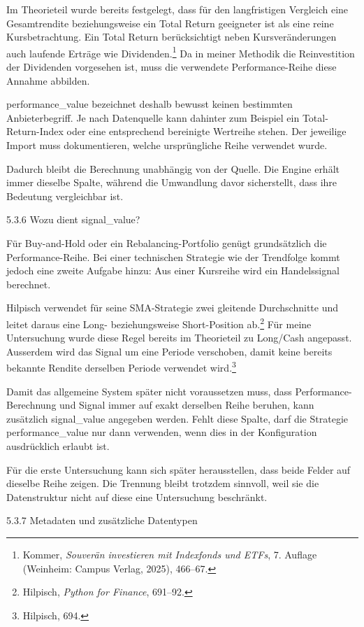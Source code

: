 \documentclass[
  ngerman,
  a4paper,
  DIV=11,
  oneside]{scrreprt}
\begin{document}
Im Theorieteil wurde bereits festgelegt, dass für den langfristigen
Vergleich eine Gesamtrendite beziehungsweise ein Total Return geeigneter
ist als eine reine Kursbetrachtung. Ein Total Return berücksichtigt
neben Kursveränderungen auch laufende Erträge wie Dividenden.\footnote{Kommer,
  \emph{Souverän investieren mit Indexfonds und ETFs}, 7. Auflage
  (Weinheim: Campus Verlag, 2025), 466--67.} Da in meiner Methodik die
Reinvestition der Dividenden vorgesehen ist, muss die verwendete
Performance-Reihe diese Annahme abbilden.

performance\_value bezeichnet deshalb bewusst keinen bestimmten
Anbieterbegriff. Je nach Datenquelle kann dahinter zum Beispiel ein
Total-Return-Index oder eine entsprechend bereinigte Wertreihe stehen.
Der jeweilige Import muss dokumentieren, welche ursprüngliche Reihe
verwendet wurde.

Dadurch bleibt die Berechnung unabhängig von der Quelle. Die Engine
erhält immer dieselbe Spalte, während die Umwandlung davor sicherstellt,
dass ihre Bedeutung vergleichbar ist.

5.3.6 Wozu dient signal\_value?

Für Buy-and-Hold oder ein Rebalancing-Portfolio genügt grundsätzlich die
Performance-Reihe. Bei einer technischen Strategie wie der Trendfolge
kommt jedoch eine zweite Aufgabe hinzu: Aus einer Kursreihe wird ein
Handelssignal berechnet.

Hilpisch verwendet für seine SMA-Strategie zwei gleitende Durchschnitte
und leitet daraus eine Long- beziehungsweise Short-Position
ab.\footnote{Hilpisch, \emph{Python for Finance}, 691--92.} Für meine
Untersuchung wurde diese Regel bereits im Theorieteil zu Long/Cash
angepasst. Ausserdem wird das Signal um eine Periode verschoben, damit
keine bereits bekannte Rendite derselben Periode verwendet
wird.\footnote{Hilpisch, 694.}

Damit das allgemeine System später nicht voraussetzen muss, dass
Performance-Berechnung und Signal immer auf exakt derselben Reihe
beruhen, kann zusätzlich signal\_value angegeben werden. Fehlt diese
Spalte, darf die Strategie performance\_value nur dann verwenden, wenn
dies in der Konfiguration ausdrücklich erlaubt ist.

Für die erste Untersuchung kann sich später herausstellen, dass beide
Felder auf dieselbe Reihe zeigen. Die Trennung bleibt trotzdem sinnvoll,
weil sie die Datenstruktur nicht auf diese eine Untersuchung beschränkt.

5.3.7 Metadaten und zusätzliche Datentypen
\end{document}
